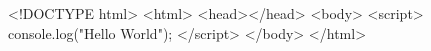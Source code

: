 <!DOCTYPE html>
<html>
    <head></head>
    <body>
        <script>
        console.log("Hello World");
        </script>
    </body>
</html>